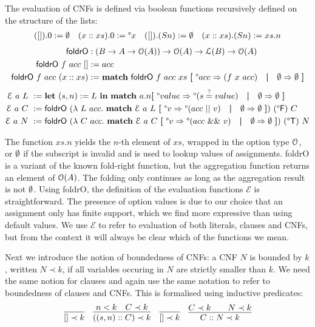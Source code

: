 \documentclass[a4paper,UKenglish,cleveref, autoref]{lipics-v2019}
\begin{document}
The evaluation of CNFs is defined via boolean functions recursively defined on the structure of the lists:
\begin{align*}
  ([]).0 := \emptyset && (x :: xs).0 := \degree x && ([]).(S n) := \emptyset && (x :: xs).(S n) := xs.n
\end{align*}
\vspace{-2em}
\begin{align*}
  \textsf{foldrO} &: (B \rightarrow A \rightarrow \mathcal{O}{(A)})  \rightarrow \mathcal{O}{(A)} \rightarrow \mathcal{L} (B) \rightarrow \mathcal{O}{(A)}\\ 
  \textsf{foldrO}~f~acc~[] &:= acc\\
  \textsf{foldrO}~f~acc~(x::xs) &:= \textbf{match}~ \textsf{foldrO}~f~acc~xs~\textbf{[}~ \degree acc \Rightarrow (f~x~acc) \quad\textbf{|}\quad \emptyset \Rightarrow \emptyset ~\textbf{]}
\end{align*}
\vspace{-2em}
\begin{align*}
  \mathcal{E}~a~L~ &:= \textbf{let}~ (s, n) := L~\textbf{in}~ \textbf{match}~ a.n \textbf{[}~ \degree value \Rightarrow \degree(s\overset{?}{=}value) \quad\textbf{|}\quad \emptyset \Rightarrow \emptyset ~\textbf{]} \\
  \mathcal{E}~a~C~ &:= \textsf{foldrO}~(\lambda~L~acc.~ \textbf{match}~ \mathcal{E}~a~L~ \textbf{[}~ \degree v \Rightarrow \degree(acc~||~v) \quad\textbf{|}\quad \emptyset \Rightarrow \emptyset~\textbf{]})~(\degree\mathsf{F})~C \\
  \mathcal{E}~a~N~ &:= \textsf{foldrO}~(\lambda~C~acc.~ \textbf{match}~ \mathcal{E}~a~C~ \textbf{[}~\degree v \Rightarrow \degree(acc~\&\&~v) \quad\textbf{|}\quad \emptyset \Rightarrow \emptyset~\textbf{]})~(\degree\mathsf{T})~N
\end{align*}

The function $xs.n$ yields the $n$-th element of $xs$, wrapped in the option type $\mathcal{O}{}$, or $\emptyset$ if the subscript is invalid and is used to lookup values of assignments. \textsf{foldrO} is a variant of the known fold-right function, but the aggregation function returns an element of $\mathcal{O}{(A)}$. The folding only continues as long as the aggregation result is not $\emptyset$. 
Using \textsf{foldrO}, the definition of the evaluation functions $\mathcal{E}$ is straightforward. The presence of option values is due to our choice that an assignment only has finite support, which we find more expressive than using default values. 
We use $\mathcal{E}$ to refer to evaluation of both literals, clauses and CNFs, but from the context it will always be clear which of the functions we mean.

Next we introduce the notion of boundedness of CNFs: a CNF $N$ is bounded by $k$, written $N \prec k$, if all variables occuring in $N$ are strictly smaller than $k$. We need the same notion for clauses and again use the same notation to refer to boundedness of clauses and CNFs. This is formalised using inductive predicates:
\begin{align*}
  \infer{[] \prec k}{} && \infer{((s, n) :: C) \prec k}{n < k \quad C \prec k} && \infer{[] \prec k}{} && \infer{C :: N \prec k}{C \prec k && N \prec k}
\end{align*}
\end{document}
